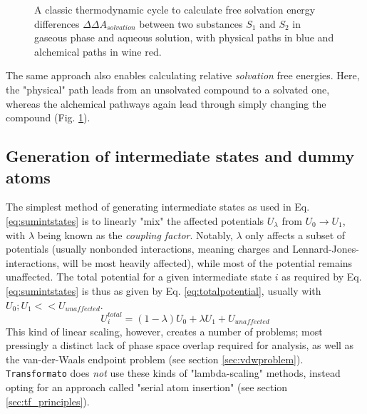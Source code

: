 \documentclass[oneside]{scrreprt}
\begin{document}
\begin{figure}[h]
    \centering
     



    \caption[Thermodynamic cycle for RSFE differences]{A classic thermodynamic cycle to calculate free solvation energy differences $\Delta\Delta A_{solvation}$ between two substances $S_1$ and $S_2$ in gaseous phase and aqueous solution, with physical paths in blue and alchemical paths in wine red.}
    \label{fig:thermocycle_rsfe}
\end{figure}


The same approach also enables calculating relative \emph{solvation} free energies. Here, the "physical" path leads from an unsolvated compound to a solvated one, whereas the alchemical pathways again lead through simply changing the compound (Fig. \ref{fig:thermocycle_rsfe}).

\subsection{Generation of intermediate states and dummy atoms} \label{sec:intstatesanddummys}

The simplest method of generating intermediate states as used in Eq. \ref{eq:sumintstates} is to linearly "mix" the affected potentials $U_\lambda$ from $U_0 \rightarrow U_1$, with $\lambda$ being known as the \emph{coupling factor}. Notably, $\lambda$ only affects a subset of potentials (usually nonbonded interactions, meaning charges and Lennard-Jones-interactions, will be most heavily affected), while most of the potential remains unaffected. The total potential for a given intermediate state $i$ as required by Eq. \ref{eq:sumintstates} is thus as given by Eq. \ref{eq:totalpotential}, usually with $U_0; U_1 << U_{unaffected}$.
\begin{equation}
U^{total}_i   = (1-\lambda)U_0 + \lambda U_1  + U_{unaffected}
\label{eq:totalpotential}
\end{equation}
This kind of linear scaling, however, creates a number of problems; most pressingly a distinct lack of phase space overlap required for analysis, as well as the van-der-Waals endpoint problem (see section \ref{sec:vdwproblem}). \texttt{Transformato} does \emph{not} use these kinds of "lambda-scaling" methods, instead opting for an approach called "serial atom insertion" (see section \ref{sec:tf_principles}).
\end{document}
